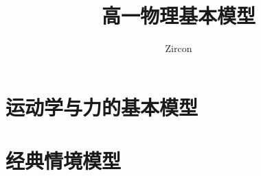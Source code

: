 \documentclass[oneside]{book}
\def\notetitle{高一物理基本模型}
\def\noteauthor{Zircon}
\def\notedate{}
\begin{document}
\title{\heiti \LARGE \notetitle \vspace*{8\baselineskip}}
\author{\noteauthor}
\date{\notedate}

\maketitle
\newpage

\setcounter{tocdepth}{1}
\tableofcontents
\newpage

\part{运动学与力的基本模型}



\part{经典情境模型}



\end{document}

